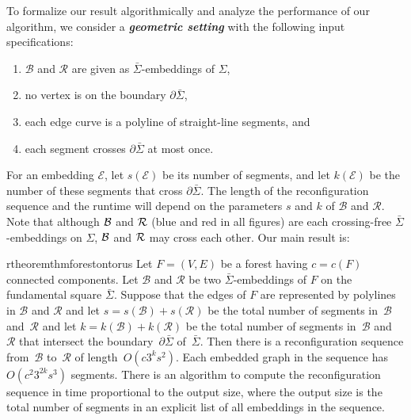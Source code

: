 \documentclass[a4paper,USenglish,cleveref,colorlinks=true,urlcolor=black,linkcolor=black,citecolor=black,thm-restate,authorcolumns]{lipics-v2021}
\newcommand{\prooflink}[1]{\hypersetup{linkcolor=lipicsBulletGray}\hyperref[#1]{$\blacktriangledown$}}
\newcommand{\statlink}[1]{\hypersetup{linkcolor=lipicsYellow}\hyperref[#1]{$\blacktriangle$}}
\newcommand{\mylink}{}
\theoremstyle{claimstyle}
\def\defn#1{\textit{\textbf{\boldmath #1}}}
\renewcommand{\emph}[1]{\defn{#1}}
\begin{document}
To formalize our result algorithmically and analyze the performance of our algorithm, we consider a \emph{geometric setting} with the following input specifications:
\begin{enumerate}[1.]
    \item $\mathcal{B}$ and $\mathcal{R}$ are given as $\bar{\Sigma}$-embeddings of $\Sigma$,
    \item no vertex is on the boundary $\partial\bar\Sigma$,
    \item each edge curve is a polyline of straight-line segments, and
    \item each segment crosses $\partial \bar{\Sigma}$ at most once.
\end{enumerate}
For an embedding $\mathcal E$, let $s({\mathcal E})$ be its number of segments, and let $k({\mathcal E})$
be the number of these segments that cross $\partial \bar{\Sigma}$.
The length of the reconfiguration sequence and the runtime will depend on
the parameters $s$ and $k$  of $\mathcal B$ and $\mathcal R$.
Note that although $\cal B$ and $\cal R$ (blue and red in all figures) are each crossing-free $\bar{\Sigma}$-embeddings on ${\Sigma}$, $\cal B$ and $\cal R$ may cross each other.
Our  main result is:

\begin{restatable}{rtheorem}{thmforestontorus}
    \label{thm:tree}
    \renewcommand{\mylink}{\statlink{thm:tree}\prooflink{Pthmforestontorus}}
    Let $F = (V,E)$ be a forest having $c=c(F)$ connected components. Let $\mathcal{B}$ and $\mathcal{R}$ be two
    $\bar{\Sigma}$-embeddings of $F$ on the fundamental square ${\bar\Sigma}$.
    Suppose that the edges of $F$ are represented by polylines in  $\mathcal{B}$ and $\mathcal{R}$ and let $s = s(\mathcal{B}) + s(\mathcal{R}) $ be the total number of segments in~$\mathcal{B}$ and~$\mathcal{R}$ and let $k = k(\mathcal{B}) + k(\mathcal{R})$ be the total number of segments in~$\mathcal{B}$ and~$\mathcal{R}$  that intersect the boundary~$\partial\bar\Sigma$ of~$\bar\Sigma$.
    Then there is a reconfiguration sequence from~$\mathcal{B}$ to~$\mathcal{R}$ of length~$O(c 3^k s^2)$.
    Each embedded graph in the sequence has~$O(c^2 3^{2k} s^3)$ segments.
    There is an algorithm to compute the reconfiguration sequence in time proportional to the output size, where the output size is the total number of segments in an explicit list of all embeddings in the sequence.%
\end{restatable}
\end{document}
